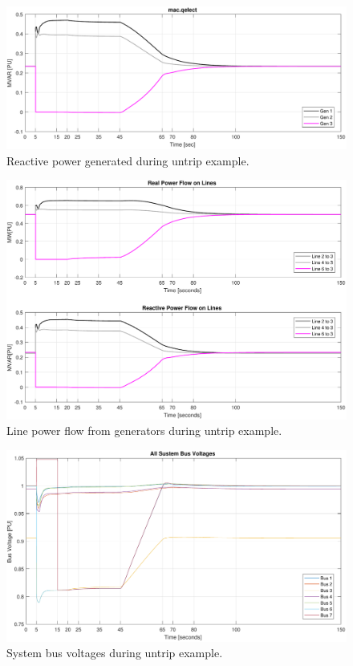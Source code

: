 \begin{figure}[H]
	\centering
	\footnotesize
	\includegraphics[width=\linewidth]{examples/untrip/combinedQelect}
	\caption{Reactive power generated during untrip example.}
	\label{fig: untrip 6}
\end{figure}%

\begin{figure}[H]
	\centering
	\footnotesize
	\includegraphics[width=\linewidth]{examples/untrip/combinedLoadFlow}
	\caption{Line power flow from generators during untrip example.}
	\label{fig: untrip 7}
\end{figure}%

\begin{figure}[H]
	\centering
	\footnotesize
	\includegraphics[width=\linewidth]{examples/untrip/combinedBusV}
	\caption{System bus voltages during untrip example.}
	\label{fig: untrip 8}
\end{figure}%





